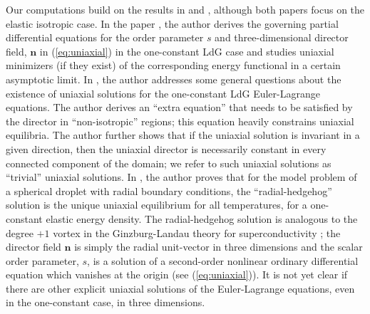 \documentclass[10pt, a4paper]{article}
\begin{document}
Our computations build on the results  in \cite{majumdarcpam2012} and \cite{lamy2015uniaxial}, although both papers focus on the elastic isotropic case. In the paper \cite{majumdarcpam2012}, the author derives the governing partial differential equations for the order parameter $s$ and three-dimensional director field, $\mathbf{n}$ in (\ref{eq:uniaxial}) in the one-constant LdG case and studies uniaxial minimizers (if they exist) of the corresponding energy functional in a certain asymptotic limit. In \cite{lamy2015uniaxial}, the author addresses some general questions about the existence of uniaxial solutions for the one-constant LdG Euler-Lagrange equations. The author derives an ``extra equation'' that needs to be satisfied by the director in ``non-isotropic'' regions; this equation heavily constrains uniaxial equilibria. The author further shows that if the uniaxial solution is invariant in a given direction, then the uniaxial director is necessarily constant in every connected component of the domain; we refer to such uniaxial solutions as ``trivial'' uniaxial solutions. In \cite{lamy2015uniaxial}, the author
proves that for the model problem of a spherical droplet with radial boundary conditions, the ``radial-hedgehog'' solution is the unique uniaxial equilibrium for all temperatures, for a one-constant elastic energy density. The radial-hedgehog solution is analogous to the degree $+1$ vortex in the Ginzburg-Landau theory for superconductivity \cite{brezisbethuelhelein}; the director field $\mathbf{n}$ is simply the radial unit-vector in three dimensions and the scalar order parameter, $s$, is a solution of a second-order nonlinear ordinary differential equation which vanishes at the origin (see (\ref{eq:uniaxial})). It is not yet clear if there are other explicit uniaxial solutions of the Euler-Lagrange equations, even in the one-constant case, in three dimensions.
\end{document}
